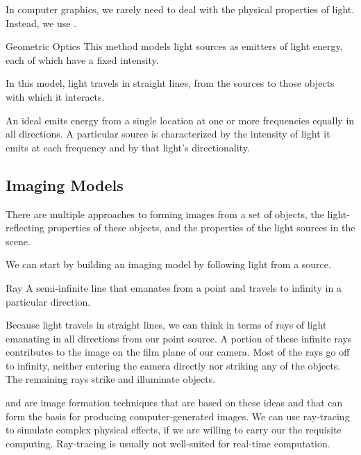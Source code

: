 \documentclass[../COS3712_Notes.tex]{subfiles}
\begin{document}
        In computer graphics, we rarely need to deal with the physical properties of light.
        Instead, we use .

        \begin{definition}{Geometric Optics}
          This method models light sources as emitters of light energy,
          each of which have a fixed intensity.

          In this model, light travels in straight lines,
          from the sources to those objects with which it interacts.
        \end{definition}

        An ideal  emits energy from a single location
        at one or more frequencies equally in all directions.
        A particular source is characterized by the
        intensity of light it emits at each frequency and
        by that light's directionality.

      \subsection{Imaging Models}
        There are multiple approaches to forming images from a set of objects,
        the light-reflecting properties of these objects, and
        the properties of the light sources in the scene.

        We can start by building an imaging model by following light from a source.

        \begin{definition}{Ray}
          A semi-infinite line that emanates from a point and
          travels to infinity in a particular direction.
        \end{definition}

        Because light travels in straight lines, we can think in terms of rays of light
        emanating in all directions from our point source.
        A portion of these infinite rays contributes to the image on the film plane of our camera.
        Most of the rays go off to infinity, neither entering the camera directly nor striking any
        of the objects.
        The remaining rays strike and illuminate objects.

         and  are image formation techniques
        that are based on these ideas and that can form the basis for producing computer-generated
        images.
        We can use ray-tracing to simulate complex physical effects,
        if we are willing to carry our the requisite computing.
        Ray-tracing is usually not well-suited for real-time computation.
\end{document}

